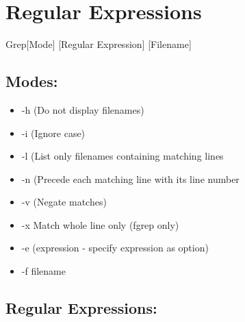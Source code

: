 \hypertarget{regular-expressions}{%
\section{Regular Expressions}\label{regular-expressions}}

Grep{[}Mode{]} {[}Regular Expression{]} {[}Filename{]}

\hypertarget{modes}{%
\subsection{Modes:}\label{modes}}

\begin{itemize}
\item
  -h (Do not display filenames)
\item
  -i (Ignore case)
\item
  -l (List only filenames containing matching lines
\item
  -n (Precede each matching line with its line number
\item
  -v (Negate matches)
\item
  -x Match whole line only (fgrep only)
\item
  -e (expression - specify expression as option)
\item
  -f filename
\end{itemize}

\hypertarget{regular-expressions-1}{%
\subsection{Regular Expressions:}\label{regular-expressions-1}}

